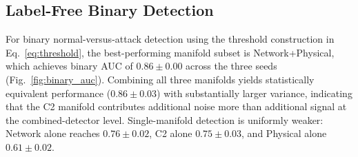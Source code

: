 \documentclass[conf]{new-aiaa}
\begin{document}
\subsection{Label-Free Binary Detection}

For binary normal-versus-attack detection using the threshold construction in Eq.~\eqref{eq:threshold}, the best-performing manifold subset is Network+Physical, which achieves binary AUC of $0.86 \pm 0.00$ across the three seeds (Fig.~\ref{fig:binary_auc}). Combining all three manifolds yields statistically equivalent performance ($0.86 \pm 0.03$) with substantially larger variance, indicating that the C2 manifold contributes additional noise more than additional signal at the combined-detector level. Single-manifold detection is uniformly weaker: Network alone reaches $0.76 \pm 0.02$, C2 alone $0.75 \pm 0.03$, and Physical alone $0.61 \pm 0.02$.
\end{document}
